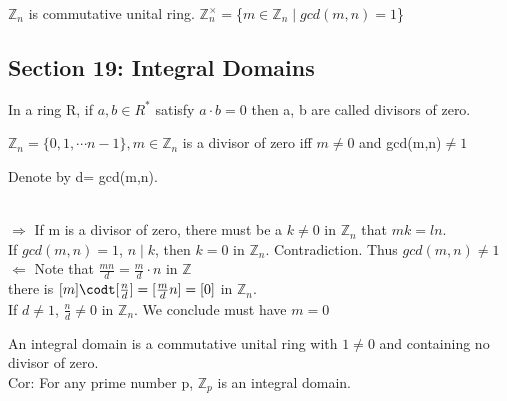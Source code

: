 \documentclass{article}
\newcommand\Z{\ensuremath{\mathbb{Z}}}
\begin{document}
\begin{Example}
    $\Z_n$ is commutative unital ring.
    $\Z_n^\times = $\{$m \in \Z_n \mid gcd(m,n) =1 $\}
\end{Example}

\newpage





\subsection{Section 19: Integral Domains}

\begin{Def}
    In a ring R, if $a, b\in R^*$ satisfy $a \cdot b = 0$ then a, b are called divisors of zero.
\end{Def}

\begin{theorem}
    $\Z_n = \{ 0,1,\cdots n-1\} , m \in \Z_n$ is a divisor of zero iff $m\neq 0$ and gcd(m,n)$\neq 1$
\end{theorem}

\begin{Proof}
    Denote by d= gcd(m,n).
    
    \\$\Rightarrow$ If m is a divisor of zero, there must be a $k \neq 0$ in $\Z_n$ that $mk = ln$.
    \\ If $gcd(m,n) = 1$, $n \mid k$, then $k = 0$ in $\Z_n$. Contradiction. Thus  $gcd(m,n) \neq 1$
    \\$\Leftarrow$ Note that $\frac{mn}{d} =\frac{m}{d} \cdot n $ in $\Z$
    \\there is $[m] \codt [\frac{n}{d}] = [\frac{m}{d} n] = [0]$ in $\Z_n$.
    \\ If $d\neq 1$, $\frac{n}{d} \neq 0 $ in $\Z_n$. We conclude must have $m = 0$
\end{Proof}


\begin{Def}
    An integral domain is a commutative unital ring with $1\neq 0$ and containing no divisor of zero.
   \\ Cor: For any prime number p, $\Z_p$ is an integral domain. 
\end{Def}
\end{document}
